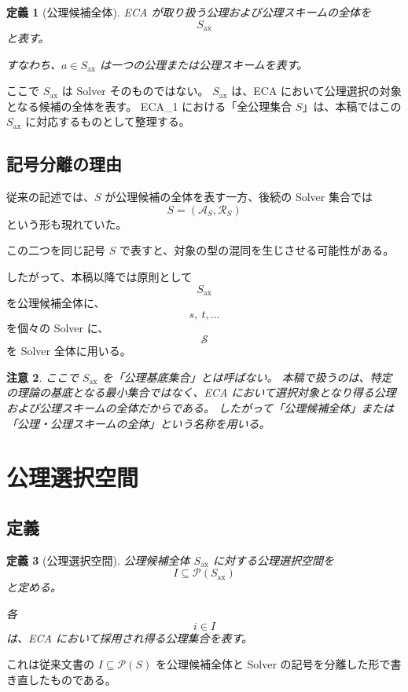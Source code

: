 \documentclass[a4paper,11pt]{jsarticle}
\newtheorem{definition}{定義}[section]
\newtheorem{remark}[definition]{注意}
\newcommand{\Solver}{\mathcal{S}}
\newcommand{\Ax}{S_{\mathrm{ax}}}
\newcommand{\Sel}{I}
\begin{document}
\begin{definition}[公理候補全体]
ECA が取り扱う公理および公理スキームの全体を
\[
\boxed{\Ax}
\]
と表す。

すなわち、$a\in\Ax$ は一つの公理または公理スキームを表す。
\end{definition}

ここで $\Ax$ は Solver そのものではない。
$\Ax$ は、ECA において公理選択の対象となる候補の全体を表す。
ECA_1 における「全公理集合 $S$」は、本稿ではこの $\Ax$ に対応するものとして整理する。

\subsection{記号分離の理由}

従来の記述では、$S$ が公理候補の全体を表す一方、後続の Solver 集合では
\[
S=(\mathcal{A}_S,\mathcal{R}_S)
\]
という形も現れていた。

この二つを同じ記号 $S$ で表すと、対象の型の混同を生じさせる可能性がある。

したがって、本稿以降では原則として
\[
\Ax
\]
を公理候補全体に、
\[
s,\ t,\ldots
\]
を個々の Solver に、
\[
\Solver
\]
を Solver 全体に用いる。

\begin{remark}
ここで $\Ax$ を「公理基底集合」とは呼ばない。
本稿で扱うのは、特定の理論の基底となる最小集合ではなく、ECA において選択対象となり得る公理および公理スキームの全体だからである。
したがって「公理候補全体」または「公理・公理スキームの全体」という名称を用いる。
\end{remark}

\section{公理選択空間}

\subsection{定義}

\begin{definition}[公理選択空間]
公理候補全体 $\Ax$ に対する公理選択空間を
\[
\boxed{\Sel\subseteq\mathcal{P}(\Ax)}
\]
と定める。

各
\[
i\in\Sel
\]
は、ECA において採用され得る公理集合を表す。
\end{definition}

これは従来文書の $I\subseteq\mathcal{P}(S)$ を公理候補全体と Solver の記号を分離した形で書き直したものである。
\end{document}
